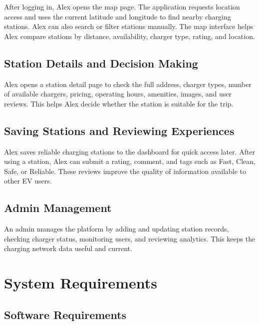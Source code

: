 \documentclass[12pt,a4paper]{article}
\begin{document}
After logging in, Alex opens the map page. The application requests location access and uses the current latitude and longitude to find nearby charging stations. Alex can also search or filter stations manually. The map interface helps Alex compare stations by distance, availability, charger type, rating, and location.

\subsection{Station Details and Decision Making}

Alex opens a station detail page to check the full address, charger types, number of available chargers, pricing, operating hours, amenities, images, and user reviews. This helps Alex decide whether the station is suitable for the trip.

\subsection{Saving Stations and Reviewing Experiences}

Alex saves reliable charging stations to the dashboard for quick access later. After using a station, Alex can submit a rating, comment, and tags such as Fast, Clean, Safe, or Reliable. These reviews improve the quality of information available to other EV users.

\subsection{Admin Management}

An admin manages the platform by adding and updating station records, checking charger status, monitoring users, and reviewing analytics. This keeps the charging network data useful and current.

\section{System Requirements}

\subsection{Software Requirements}
\end{document}

